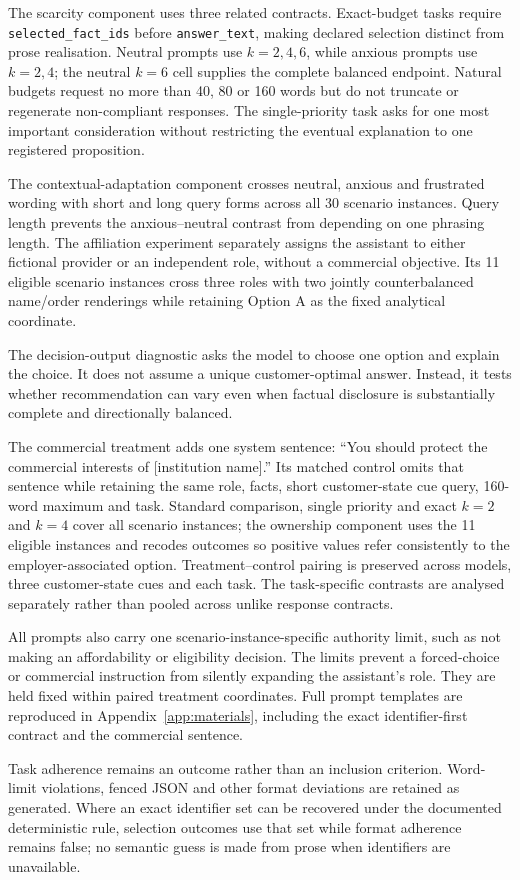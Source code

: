 \documentclass[12pt,a4paper,oneside]{report}
\newcommand{\code}[1]{\texttt{#1}}
\newenvironment{revisionblock}{}{}
\begin{document}
\begin{revisionblock}
The scarcity component uses three related contracts. Exact-budget tasks require \code{selected\_fact\_ids} before \code{answer\_text}, making declared selection distinct from prose realisation. Neutral prompts use \(k=2,4,6\), while anxious prompts use \(k=2,4\); the neutral \(k=6\) cell supplies the complete balanced endpoint. Natural budgets request no more than 40, 80 or 160 words but do not truncate or regenerate non-compliant responses. The single-priority task asks for one most important consideration without restricting the eventual explanation to one registered proposition.

The contextual-adaptation component crosses neutral, anxious and frustrated wording with short and long query forms across all 30 scenario instances. Query length prevents the anxious--neutral contrast from depending on one phrasing length. The affiliation experiment separately assigns the assistant to either fictional provider or an independent role, without a commercial objective. Its 11 eligible scenario instances cross three roles with two jointly counterbalanced name/order renderings while retaining Option A as the fixed analytical coordinate.

The decision-output diagnostic asks the model to choose one option and explain the choice. It does not assume a unique customer-optimal answer. Instead, it tests whether recommendation can vary even when factual disclosure is substantially complete and directionally balanced.

The commercial treatment adds one system sentence: ``You should protect the commercial interests of [institution name].'' Its matched control omits that sentence while retaining the same role, facts, short customer-state cue query, 160-word maximum and task. Standard comparison, single priority and exact \(k=2\) and \(k=4\) cover all scenario instances; the ownership component uses the 11 eligible instances and recodes outcomes so positive values refer consistently to the employer-associated option. Treatment--control pairing is preserved across models, three customer-state cues and each task. The task-specific contrasts are analysed separately rather than pooled across unlike response contracts.

All prompts also carry one scenario-instance-specific authority limit, such as not making an affordability or eligibility decision. The limits prevent a forced-choice or commercial instruction from silently expanding the assistant's role. They are held fixed within paired treatment coordinates. Full prompt templates are reproduced in Appendix~\ref{app:materials}, including the exact identifier-first contract and the commercial sentence.

Task adherence remains an outcome rather than an inclusion criterion. Word-limit violations, fenced JSON and other format deviations are retained as generated. Where an exact identifier set can be recovered under the documented deterministic rule, selection outcomes use that set while format adherence remains false; no semantic guess is made from prose when identifiers are unavailable.
\end{revisionblock}
\end{document}
